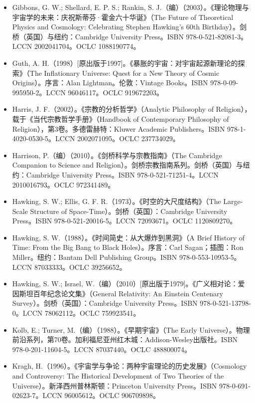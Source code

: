 \begin{itemize}
\item Gibbons, G. W.; Shellard, E. P. S.; Rankin, S. J.（编）（2003）。《理论物理与宇宙学的未来：庆祝斯蒂芬·霍金六十华诞》（The Future of Theoretical Physics and Cosmology: Celebrating Stephen Hawking's 60th Birthday）。剑桥（英国）与纽约：Cambridge University Press。ISBN 978-0-521-82081-3。LCCN 2002041704。OCLC 1088190774。  
\item Guth, A. H.（1998）[原出版于1997]。《暴胀的宇宙：对宇宙起源新理论的探索》（The Inflationary Universe: Quest for a New Theory of Cosmic Origins）。序言：Alan Lightman。伦敦：Vintage Books。ISBN 978-0-09-995950-2。LCCN 96046117。OCLC 919672203。  
\item Harris, J. F.（2002）。《宗教的分析哲学》（Analytic Philosophy of Religion），载于《当代宗教哲学手册》（Handbook of Contemporary Philosophy of Religion），第3卷。多德雷赫特：Kluwer Academic Publishers。ISBN 978-1-4020-0530-5。LCCN 2002071095。OCLC 237734029。  
\item Harrison, P.（编）（2010）。《剑桥科学与宗教指南》（The Cambridge Companion to Science and Religion）。剑桥宗教指南系列。剑桥（英国）与纽约：Cambridge University Press。ISBN 978-0-521-71251-4。LCCN 2010016793。OCLC 972341489。  
\item Hawking, S. W.; Ellis, G. F. R.（1973）。《时空的大尺度结构》（The Large-Scale Structure of Space-Time）。剑桥（英国）：Cambridge University Press。ISBN 978-0-521-20016-5。LCCN 72093671。OCLC 1120809270。  
\item Hawking, S. W.（1988）。《时间简史：从大爆炸到黑洞》（A Brief History of Time: From the Big Bang to Black Holes）。序言：Carl Sagan；插图：Ron Miller。纽约：Bantam Dell Publishing Group。ISBN 978-0-553-10953-5。LCCN 87033333。OCLC 39256652。  
\item Hawking, S. W.; Israel, W.（编）（2010）[原出版于1979]。《广义相对论：爱因斯坦百年纪念论文集》（General Relativity: An Einstein Centenary Survey）。剑桥（英国）：Cambridge University Press。ISBN 978-0-521-13798-0。LCCN 78062112。OCLC 759923541。  
\item Kolb, E.; Turner, M.（编）（1988）。《早期宇宙》（The Early Universe）。物理前沿系列，第70卷。加利福尼亚州红木城：Addison-Wesley出版社。ISBN 978-0-201-11604-5。LCCN 87037440。OCLC 488800074。  
\item Kragh, H.（1996）。《宇宙学与争论：两种宇宙理论的历史发展》（Cosmology and Controversy: The Historical Development of Two Theories of the Universe）。新泽西州普林斯顿：Princeton University Press。ISBN 978-0-691-02623-7。LCCN 96005612。OCLC 906709898。  

\end{itemize}
